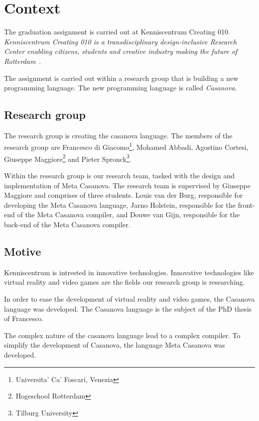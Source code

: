 \section{Context}\label{context}
The graduation assignment is carried out at Kenniscentrum Creating 010.
\textit{Kenniscentrum Creating 010 is a transdisciplinary design-inclusive Research Center enabling citizens, students and creative industry making the future of Rotterdam}~\cite{creating2016home}.

The assignment is carried out within a research group that is building a new programming language.
The new programming language is called \textit{Casanova}.

\subsection{Research group}
The research group is creating the casanova language.
The members of the research group are 
  Francesco di Giacomo\footnote{\label{venice}Universita' Ca' Foscari, Venezia}, 
  Mohamed Abbadi, 
  Agostino Cortesi, 
  Giuseppe Maggiore\footnote{Hogeschool Rotterdam} and 
  Pieter Spronck\footnote{Tilburg University}.

Within the research group is our research team, tasked with the design and implementation of Meta Casanova.
The research team is supervised by Giuseppe Maggiore and comprises of three students.
Louis van der Burg, responsible for developing the Meta Casanova language,
Jarno Holstein, responsible for the front-end of the Meta Casanova compiler,
and Douwe van Gijn, responsible for the back-end of the Meta Casanova compiler.

\subsection{Motive}\label{motive}
Kenniscentrum is intrested in innovative technologies.
Innovative technologies like virtual reality and video games are the fields our research group is researching.

In order to ease the development of virtual reality and video games, the Casanova language was developed.
The Casanova language is the subject of the PhD thesis of Francesco.

The complex nature of the casanova language lead to a complex compiler.
To simplify the development of Casanova, the language Meta Casanova was developed.

